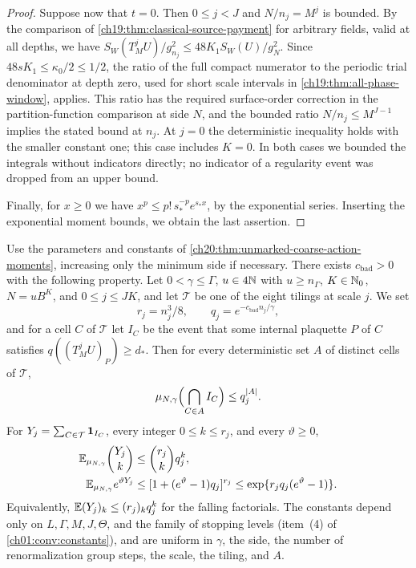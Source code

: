 \begin{proof}
Suppose now that $t=0$. Then $0\le j<J$ and $N/n_j=M^j$ is bounded. By the comparison of \cref{ch19:thm:classical-source-payment} for arbitrary fields, valid at all depths, we have $S_W(T_M^jU)/g_{n_j}^2\le48K_1S_W(U)/g_N^2$. Since $48sK_1\le\kappa_0/2\le1/2$, the ratio of the full compact numerator to the periodic trial denominator at depth zero, used for short scale intervals in \cref{ch19:thm:all-phase-window}, applies. This ratio has the required surface-order correction in the partition-function comparison at side $N$, and the bounded ratio $N/n_j\le M^{J-1}$ implies the stated bound at $n_j$. At $j=0$ the deterministic inequality holds with the smaller constant one; this case includes $K=0$. In both cases we bounded the integrals without indicators directly; no indicator of a regularity event was dropped from an upper bound.

Finally, for $x\ge0$ we have $x^p\le p!\,s_*^{-p}e^{s_*x}$, by the exponential series. Inserting the exponential moment bounds, we obtain the last assertion.
\end{proof}

\begin{corollary}\label{ch20:cor:joint-unconditional-bad-cells}
Use the parameters and constants of \cref{ch20:thm:unmarked-coarse-action-moments}, increasing only the minimum side if necessary. There exists $c_{\mathrm{bad}}>0$ with the following property. Let $0<\gamma\le\Gamma$, $u\in4\mathbb N$ with $u\ge n_\Gamma$, $K\in\mathbb N_0$, $N=uB^K$, and $0\le j\le JK$, and let $\mathcal T$ be one of the eight tilings at scale $j$. We set
\[
 r_j=n_j^3/8,\qquad q_j=e^{-c_{\mathrm{bad}}n_j/\gamma},
\]
and for a cell $C$ of $\mathcal T$ let $I_C$ be the event that some internal plaquette $P$ of $C$ satisfies $q((T_M^jU)_P)\ge d_*$. Then for every deterministic set $A$ of distinct cells of $\mathcal T$,
\begin{equation}\label{ch20:eq:joint-unconditional-bad-cells}
 \mu_{N,\gamma}\Bigl(\bigcap_{C\in A}I_C\Bigr)\le q_j^{\lvert A\rvert}.
\end{equation}
For $Y_j=\sum_{C\in\mathcal T}\mathbf 1_{I_C}$, every integer $0\le k\le r_j$, and every $\vartheta\ge0$,
\begin{align}
 \mathbb E_{\mu_{N,\gamma}}\binom{Y_j}{k}&\le\binom{r_j}{k}q_j^k,
 \label{ch20:eq:unconditional-factorial-moments}\\
 \mathbb E_{\mu_{N,\gamma}}e^{\vartheta Y_j}&\le[1+(e^\vartheta-1)q_j]^{r_j}\le\exp\{r_jq_j(e^\vartheta-1)\}.
 \label{ch20:eq:unconditional-binomial-envelope}
\end{align}
Equivalently, $\mathbb E(Y_j)_k\le(r_j)_kq_j^k$ for the falling factorials. The constants depend only on $L,\Gamma,M,J,\Theta$, and the family of stopping levels (item~\textup{(4)} of \cref{ch01:conv:constants}), and are uniform in $\gamma$, the side, the number of renormalization group steps, the scale, the tiling, and $A$.
\end{corollary}

